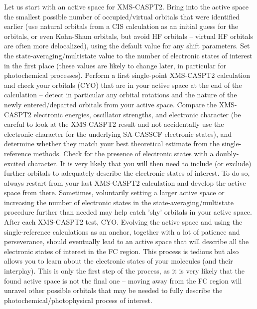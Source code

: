 \documentclass[9pt,bestpractices,pubversion]{livecoms}
\begin{document}
Let us start with an active space for XMS-CASPT2. Bring into the active space the smallest possible number of occupied/virtual orbitals that were identified earlier (use natural orbitals from a CIS calculation as an initial guess for the orbitals, or even Kohn-Sham orbitals, but avoid HF orbitals -- virtual HF orbitals are often more delocalized), using the default value for any shift parameters. Set the state-averaging/multistate value to the number of electronic states of interest in the first place (these values are likely to change later, in particular for photochemical processes). Perform a first single-point XMS-CASPT2 calculation and check your orbitals (CYO) that are in your active space at the end of the calculation -- detect in particular any orbital rotations and the nature of the newly entered/departed orbitals from your active space. Compare the XMS-CASPT2 electronic energies, oscillator strengths, and electronic character (be careful to look at the XMS-CASPT2 result and not accidentally use the electronic character for the underlying SA-CASSCF electronic states), and determine whether they match your best theoretical estimate from the single-reference methods. Check for the presence of electronic states with a doubly-excited character. It is very likely that you will then need to include (or exclude) further orbitals to adequately describe the electronic states of interest. To do so, always restart from your last XMS-CASPT2 calculation and develop the active space from there. Sometimes, voluntarily setting a larger active space or increasing the number of electronic states in the state-averaging/multistate procedure further than needed may help catch 'shy' orbitals in your active space. After each XMS-CASPT2 test, CYO. Evolving the active space and using the single-reference calculations as an anchor, together with a lot of patience and perseverance, should eventually lead to an active space that will describe all the electronic states of interest in the FC region. This process is tedious but also allows you to learn about the electronic states of your molecules (and their interplay). This is only the first step of the process, as it is very likely that the found active space is not the final one -- moving away from the FC region will unravel other possible orbitals that may be needed to fully describe the photochemical/photophysical process of interest.  
\end{document}
